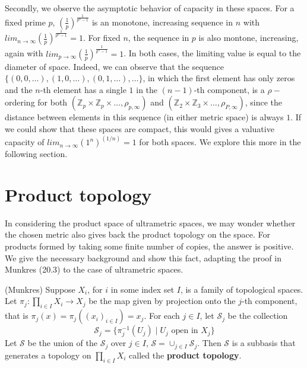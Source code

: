 Secondly, we observe the asymptotic behavior of capacity in these spaces. For a fixed prime $p$,  $(\frac{1}{p})^{\frac{1}{p^n-1}}$ is an monotone, increasing sequence in $n$ with $ lim_{n\to\infty} (\frac{1}{p})^{\frac{1}{p^n-1}} =  1$. For fixed $n$, the sequence in $p$ is also montone, increasing, again with  $ lim_{p\to\infty} (\frac{1}{p})^{\frac{1}{p^n-1}}=1$. In both cases, the limiting value is equal to the diameter of space. Indeed, we can observe that the sequence $\{(0,0,\ldots), (1,0,\ldots), (0,1,\ldots), \ldots\}$, in which the first element has only zeros and the $n$-th element has a single $1$ in the $(n-1)$-th component, is a $\rho-$ordering for both  $(\mathbb{Z}_p \times \mathbb{Z}_p \times \ldots, \rho_{p,\infty})$  and  $(\mathbb{Z}_2 \times \mathbb{Z}_3 \times \ldots, \rho_{P,\infty})$, since the distance between elements in this sequence (in either metric space) is always $1$. If we could show that these spaces are compact, this would gives a valuative capacity of $lim_{n\to\infty} (1^n)^{(1/n)} =1$ for both spaces. We explore this more in the following section.\\

\section*{Product topology}
In considering the product space of ultrametric spaces, we may wonder whether the chosen metric also gives back the product topology on the space.  For products formed by taking some finite number of copies, the answer is positive. We give the necessary background and show this fact, adapting the proof in Munkres (20.3) to the case of ultrametric spaces. 

\begin{definition-proposition*} (Munkres)
Suppose $X_i$, for $i$ in some index set $I$, is a family of topological spaces.  Let $\pi_j: \prod_{i \in I} X_i \rightarrow X_j$ be the map given by projection onto the $j$-th component, that is $\pi_j (x) = \pi_j ((x_i)_{i \in I}) = x_j$. For each $j \in I$, let $\mathcal{S}_j$ be the collection \[\mathcal{S}_j = \{\pi^{-1}_j (U_j)\mid U_j \text{ open in } X_j\}\] Let $\mathcal{S}$ be the union of the $\mathcal{S}_j$ over $j \in I$, $\mathcal{S}= \cup_{j \in I} \mathcal{S}_j$. Then $\mathcal{S}$ is a subbasis that generates a topology on  $\prod_{i \in I} X_i$ called the \textbf{product topology}.\\

\end{definition-proposition*}


